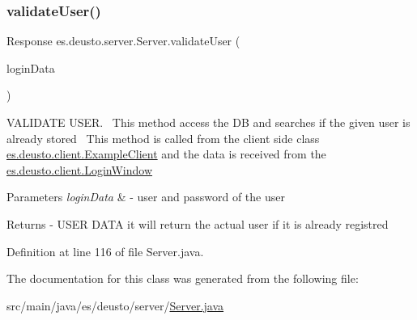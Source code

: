 \subsubsection{\texorpdfstring{validate\+User()}{validateUser()}}
{\footnotesize\ttfamily Response es.\+deusto.\+server.\+Server.\+validate\+User (\begin{DoxyParamCaption}\item[{\hyperlink{classes_1_1deusto_1_1serialization_1_1_login_data}{Login\+Data}}]{login\+Data }\end{DoxyParamCaption})}

V\+A\+L\+I\+D\+A\+TE U\+S\+ER.~\newline
This method access the DB and searches if the given user is already stored~\newline
This method is called from the client side class \hyperlink{classes_1_1deusto_1_1client_1_1_example_client}{es.\+deusto.\+client.\+Example\+Client} and the data is received from the \hyperlink{classes_1_1deusto_1_1client_1_1_login_window}{es.\+deusto.\+client.\+Login\+Window}~\newline
 
\begin{DoxyParams}{Parameters}
{\em login\+Data} & -\/ user and password of the user \\
\hline
\end{DoxyParams}
\begin{DoxyReturn}{Returns}
-\/ U\+S\+ER D\+A\+TA it will return the actual user if it is already registred 
\end{DoxyReturn}


Definition at line 116 of file Server.\+java.



The documentation for this class was generated from the following file\+:\begin{DoxyCompactItemize}
\item 
src/main/java/es/deusto/server/\hyperlink{_server_8java}{Server.\+java}\end{DoxyCompactItemize}
